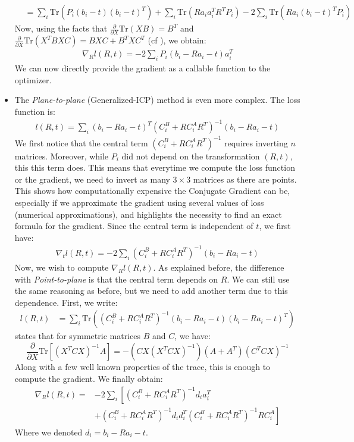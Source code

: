 \documentclass[11pt,letterpaper,leqno]{article}
\begin{document}
\begin{itemize}
\begin{align*}
        &= \sum_i \text{Tr}\left(P_i (b_i - t)(b_i - t)^T \right) +\sum_i \text{Tr}\left(R a_i a_i^T R^T P_i\right) - 2\sum_i \text{Tr}\left(R a_i(b_i-t)^T P_i\right)
    \end{align*}
    Now, using the facts that $\frac{\partial}{\partial X} \text{Tr}(XB) = B^T$ and $\frac{\partial}{\partial X} \text{Tr}(X^TBXC) = BXC + B^TXC^T$ (cf \cite{cookbook}), we obtain:
    \begin{align}
        \nabla_R l(R,t) = - 2 \sum_i P_i (b_i - R a_i -t) a_i^T
    \end{align}
    We can now directly provide the gradient as a callable function to the optimizer.
    \item The \textit{Plane-to-plane} (Generalized-ICP) method is even more complex. The loss function is:
    \begin{align*}
        l(R,t) = \sum_i (b_i - Ra_i - t)^T \left(C_i^B + R C_i^A R^T\right)^{-1} (b_i - Ra_i - t)
    \end{align*}
    We first notice that the central term $\left(C_i^B + R C_i^A R^T\right)^{-1}$ requires inverting $n$ matrices. Moreover, while $P_i$ did not depend on the transformation $(R,t)$, this this term does. This means that everytime we compute the loss function or the gradient, we need to invert as many $3\times 3$ matrices as there are points. This shows how computationally expensive the Conjugate Gradient can be, especially if we approximate the gradient using several values of loss (numerical approximations), and highlights the necessity to find an exact formula for the gradient. Since the central term is independent of $t$, we first have: 
    \begin{align}
        \nabla_t l(R,t) = - 2 \sum_i \left(C_i^B + R C_i^A R^T\right)^{-1} (b_i - R a_i -t)
    \end{align}
    Now, we wish to compute $\nabla_R l(R,t)$. As explained before, the difference with \textit{Point-to-plane} is that the central term depends on $R$. We can still use the same reasoning as before, but we need to add another term due to this dependence. First, we write:
    \begin{align*}
        l(R,t) &= \sum_i \text{Tr}(\left(C_i^B + R C_i^A R^T\right)^{-1} (b_i - R a_i - t) (b_i - R a_i - t)^T)
    \end{align*}
    \cite{cookbook} states that for symmetric matrices $B$ and $C$, we have: $$\frac{\partial}{\partial X} \text{Tr}\left[(X^TCX)^{-1} A\right] = -(CX(X^TCX)^{-1})(A+A^T)(C^TCX)^{-1}$$
    Along with a few well known properties of the trace, this is enough to compute the gradient. We finally obtain:
    \begin{align}
        \nabla_R l(R,t) =& - 2 \sum_i \left[ \left(C_i^B + R C_i^A R^T\right)^{-1} d_i a_i^T \right. \\ &+\left. \left(C_i^B + R C_i^A R^T\right)^{-1} d_i d_i^T \left(C_i^B + R C_i^A R^T\right)^{-1} R C_i^A\right] \nonumber
    \end{align}
    Where we denoted $d_i = b_i - R a_i - t$.
\end{itemize}
\end{document}
